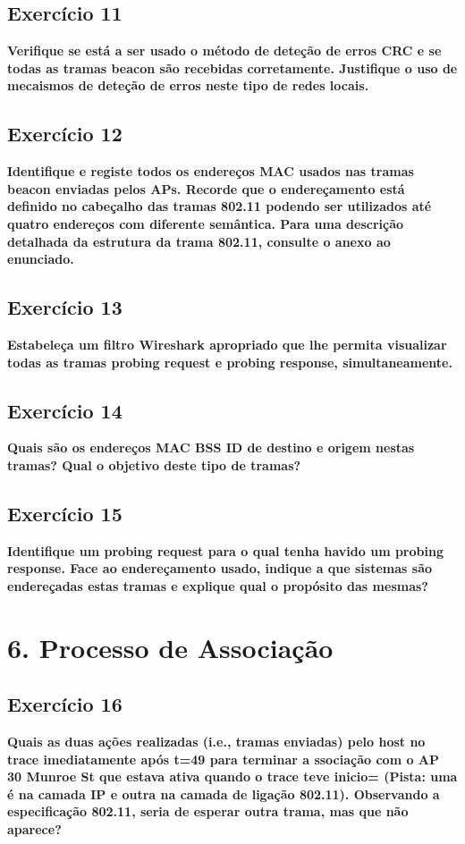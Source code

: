 \documentclass[a4paper]{report}
\begin{document}
\section{Exercício 11}
\textbf{Verifique se está a ser usado o método de deteção de erros CRC e se
    todas as tramas beacon são recebidas corretamente. Justifique o uso de
    mecaismos de deteção de erros neste tipo de redes locais.}

\section{Exercício 12}
\textbf{Identifique e registe todos os endereços MAC usados nas tramas beacon
    enviadas pelos APs. Recorde que o endereçamento está definido no cabeçalho
    das tramas 802.11 podendo ser utilizados até quatro endereços com diferente
    semântica. Para uma descrição detalhada da estrutura da trama 802.11,
    consulte o anexo ao enunciado.}

\section{Exercício 13}
\textbf{Estabeleça um filtro Wireshark apropriado que lhe permita visualizar
    todas as tramas probing request e probing response, simultaneamente.}

\section{Exercício 14}
\textbf{Quais são os endereços MAC BSS ID de destino e origem nestas tramas?
    Qual o objetivo deste tipo de tramas?}

\section{Exercício 15}
\textbf{Identifique um probing request para o qual tenha havido um probing
    response. Face ao endereçamento usado, indique a que sistemas são
    endereçadas estas tramas e explique qual o propósito das mesmas?}

\chapter{6. Processo de Associação}
\section{Exercício 16}
\textbf{Quais as duas ações realizadas (i.e., tramas enviadas) pelo host no
    trace imediatamente após t=49 para terminar a ssociação com o AP 30 Munroe
    St que estava ativa quando o trace teve inicio= (Pista: uma é na camada IP e
    outra na camada de ligação 802.11). Observando a especificação 802.11, seria
    de esperar outra trama, mas que não aparece?}
\end{document}
